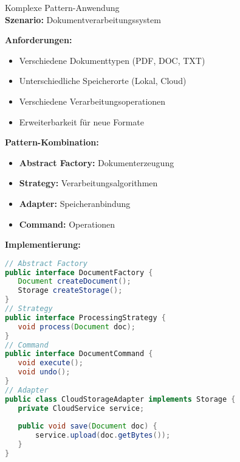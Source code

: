 \begin{example2}{Komplexe Pattern-Anwendung}\\
\textbf{Szenario:} Dokumentverarbeitungssystem

\textbf{Anforderungen:}
\begin{itemize}
   \item Verschiedene Dokumenttypen (PDF, DOC, TXT)
   \item Unterschiedliche Speicherorte (Lokal, Cloud)
   \item Verschiedene Verarbeitungsoperationen
   \item Erweiterbarkeit für neue Formate
\end{itemize}

\textbf{Pattern-Kombination:}
\begin{itemize}
   \item \textbf{Abstract Factory:} Dokumenterzeugung
   \item \textbf{Strategy:} Verarbeitungsalgorithmen
   \item \textbf{Adapter:} Speicheranbindung
   \item \textbf{Command:} Operationen
\end{itemize}

\textbf{Implementierung:}
\begin{lstlisting}[language=Java, style=basesmol]
// Abstract Factory
public interface DocumentFactory {
   Document createDocument();
   Storage createStorage();
}
// Strategy
public interface ProcessingStrategy {
   void process(Document doc);
}
// Command
public interface DocumentCommand {
   void execute();
   void undo();
}
// Adapter
public class CloudStorageAdapter implements Storage {
   private CloudService service;
   
   public void save(Document doc) {
       service.upload(doc.getBytes());
   }
}
\end{lstlisting}
\end{example2}



